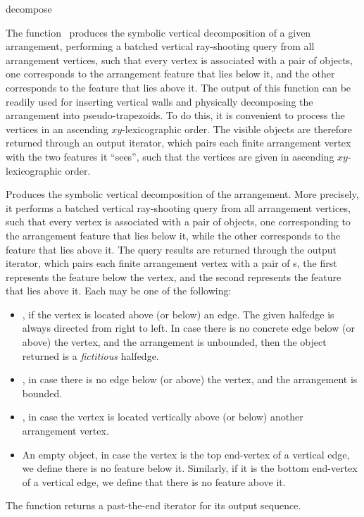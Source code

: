 \ccRefPageBegin

\begin{ccRefFunction}{decompose}

\ccDefinition

The function \ccRefName\ produces the symbolic vertical decomposition of a
given arrangement, performing a batched vertical ray-shooting query from
all arrangement vertices, such that every vertex is associated with a pair
of objects, one corresponds to the arrangement feature that lies below it,
and the other corresponds to the feature that lies above it.
The output of this function can be readily used for inserting vertical walls
and physically decomposing the arrangement into pseudo-trapezoids. To do
this, it is convenient to process the vertices in an ascending
$xy$-lexicographic order. The visible objects are therefore returned through
an output iterator, which pairs each finite arrangement vertex with the two
features it ``sees'', such that the vertices are given in ascending
$xy$-lexicographic order. 



Produces the symbolic vertical decomposition of the  arrangement.
More precisely, it performs a batched vertical ray-shooting query from all
arrangement vertices, such that every vertex is associated with a pair of
objects, one corresponding to the arrangement feature that lies below it,
while the other corresponds to the feature that lies above it. 
The query results are returned through the output iterator, which pairs
each finite arrangement vertex with a pair of s, the first
represents the feature below the vertex, and the second represents the
feature that lies above it. Each  may be one of the following:
\begin{itemize}
\item {}, if the vertex is located above (or
  below) an edge. The given halfedge is always directed from right to left.
  In case there is no concrete edge below (or above) the vertex, and
  the arrangement is unbounded, then the object returned is a
  \emph{fictitious} halfedge.
\item {}, in case there is no edge below (or above)
  the vertex, and the arrangement is bounded.
\item {}, in case the vertex is located vertically
  above (or below) another arrangement vertex.
\item An empty object, in case the vertex is the top end-vertex of
  a vertical edge, we define there is no feature below it. Similarly, if
  it is the bottom end-vertex of a vertical edge, we define that there
  is no feature above it.
\end{itemize}
The function returns a past-the-end iterator for its output sequence.


\end{ccRefFunction}
